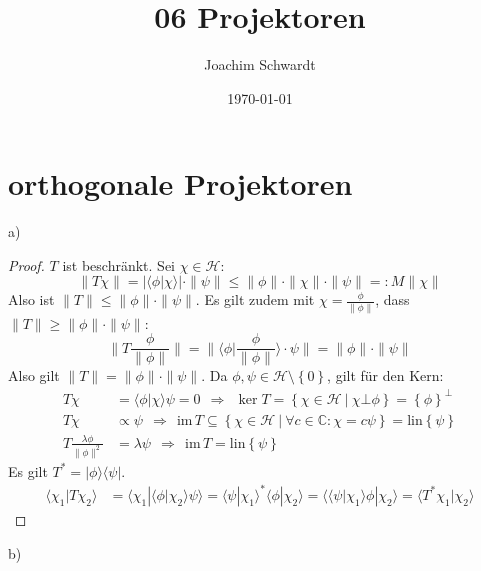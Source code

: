 \documentclass[a4paper,12pt]{article}
\newcommand{\brak}{}
\newcommand{\klammer}{}
\newcommand{\oper}{}
\begin{document}
\title{06 Projektoren}
\author{Joachim Schwardt}
\date{\today}
\maketitle

\section{orthogonale Projektoren}
a)
\begin{proof}
$T$ ist beschränkt. Sei $\chi\in\mathcal{H}$:
$$\|T\chi\|=|\brak\langle {\phi}| {\chi}\rangle|\cdot\|\psi\|\le \|\phi\|\cdot\|\chi\|\cdot\|\psi\|=:M\|\chi\|$$
Also ist $\|T\|\le\|\phi\|\cdot\|\psi\|$. Es gilt zudem mit $\chi =\frac{\phi}{\|\phi\|}$, dass $\|T\|\ge\|\phi\|\cdot\|\psi\|$:
$$\|T\frac{\phi}{\|\phi\|}\|=\|\brak\langle {\phi}| {\frac{\phi}{\|\phi\|}}\rangle\cdot\psi\|=\|\phi\|\cdot\|\psi\|$$
Also gilt $\|T\| = \|\phi\|\cdot\|\psi\|$. Da $\phi,\psi\in\mathcal{H}\setminus\klammer\left\{ {0} \right\}$, gilt für den Kern:
\begin{align*}
T\chi &=\brak\langle {\phi}| {\chi}\rangle\psi=0\ \ \Rightarrow\ \ \ker T=\klammer\left\{ {\chi\in\mathcal{H}\ \vert\ \chi\bot\phi} \right\}=\klammer\left\{ {\phi} \right\}^\bot \\
T\chi &\propto\psi\ \ \Rightarrow\ \ \mathrm{im\,}T\subseteq\klammer\left\{ {\chi\in\mathcal{H}\ \vert\ \forall c\in\mathbb{C}:\chi=c\psi} \right\}= \mathrm{lin}\klammer\left\{ {\psi} \right\}\\
T\frac{\lambda\phi}{\|\phi\|^2}&=\lambda\psi\ \ \Rightarrow\ \ \mathrm{im\,}T = \mathrm{lin}\klammer\left\{ {\psi} \right\}
\end{align*}
Es gilt $T^\ast = \oper |\phi\rangle\langle \psi|$.
\begin{align*}
\brak\langle {\chi_1}| {T\chi_2}\rangle&=\brak\langle {\chi_1}| {\brak\langle {\phi}| {\chi_2}\rangle\psi}\rangle=\brak\langle {\psi}| {\chi_1}\rangle^\ast\brak\langle {\phi}| {\chi_2}\rangle=\brak\langle {\brak\langle {\psi}| {\chi_1}\rangle\phi}| {\chi_2}\rangle=\brak\langle {T^\ast\chi_1}| {\chi_2}\rangle
\end{align*}
\end{proof}
b)
\end{document}
